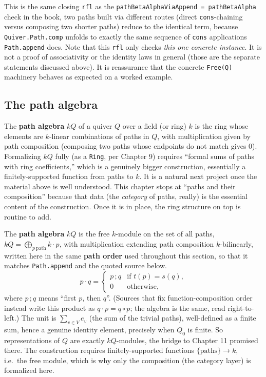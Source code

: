 This is the same closing \texttt{rfl} as the \texttt{pathBetaAlphaViaAppend = pathBetaAlpha} check in the book, two paths built via different routes (direct \texttt{cons}-chaining versus composing two shorter paths) reduce to the identical term, because \texttt{Quiver.Path.comp} unfolds to exactly the same sequence of \texttt{cons} applications \texttt{Path.append} does. Note that this \texttt{rfl} only checks \emph{this one concrete instance}. It is not a proof of associativity or the identity laws in general (those are the separate statements discussed above). It is reassurance that the concrete \texttt{Free(Q)} machinery behaves as expected on a worked example.

\subsection{The path algebra}\label{sec:12-path-algebras:05-path-composition:3}

The \textbf{path algebra} \(kQ\) of a quiver \(Q\) over a field (or ring) \(k\) is the ring whose elements are \(k\)-linear combinations of paths in \(Q\), with multiplication given by path composition (composing two paths whose endpoints do not match gives \(0\)). Formalizing \(kQ\) fully (as a \texttt{Ring}, per Chapter 9) requires ``formal sums of paths with ring coefficients,'' which is a genuinely bigger construction, essentially a finitely-supported function from paths to \(k\). It is a natural next project once the material above is well understood. This chapter stops at ``paths and their composition'' because that data (the \emph{category} of paths, really) is the essential content of the construction. Once it is in place, the ring structure on top is routine to add.

\begin{mathreading}

The \textbf{path algebra} \(kQ\) is the free \(k\)-module on the set of all paths, \(kQ = \bigoplus_{p\ \text{path}} k\cdot p\), with multiplication extending path composition \(k\)-bilinearly, written here in the same \textbf{path order} used throughout this section, so that it matches \texttt{Path.append} and the quoted source below. \[
p \cdot q = \begin{cases} p\,;q & \text{if } t(p) = s(q),\\ 0 &
\text{otherwise,}\end{cases}
\] where \(p\,;q\) means ``first \(p\), then \(q\)''. (Sources that fix function-composition order instead write this product as \(q \cdot p = q \circ
p\); the algebra is the same, read right-to-left.) The unit is \(\sum_{v\in V} e_v\) (the sum of the trivial paths), well-defined as a finite sum, hence a genuine identity element, precisely when \(Q_0\) is finite. So representations of \(Q\) are exactly \(kQ\)-modules, the bridge to Chapter 11 promised there. The construction requires finitely-supported functions \(\{\text{paths}\} \to k\), i.e.~the free module, which is why only the composition (the category layer) is formalized here.

\end{mathreading}

